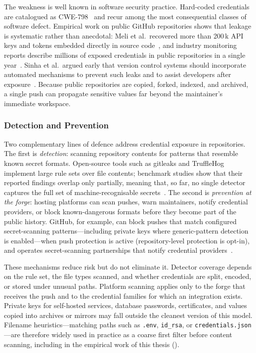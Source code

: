 The weakness is well known in software security practice.
Hard-coded credentials are catalogued as CWE-798~\cite{cwe798} and recur among the most consequential classes of software defect.
Empirical work on public GitHub repositories shows that leakage is systematic rather than anecdotal: Meli et al.\ recovered more than \num{200}\,k API keys and tokens embedded directly in source code~\cite{DBLP:conf/ndss/MeliMR19}, and industry monitoring reports describe millions of exposed credentials in public repositories in a single year~\cite{segura2022secrets}.
Sinha et al.\ argued early that version control systems should incorporate automated mechanisms to prevent such leaks and to assist developers after exposure~\cite{DBLP:conf/msr/SinhaSDPM15}.
Because public repositories are copied, forked, indexed, and archived, a single push can propagate sensitive values far beyond the maintainer's immediate workspace.

\subsubsection{Detection and Prevention}
\label{subsec:bg-secrets-detection}

Two complementary lines of defence address credential exposure in repositories.
The first is \emph{detection}: scanning repository contents for patterns that resemble known secret formats.
Open-source tools such as gitleaks and TruffleHog implement large rule sets over file contents; benchmark studies show that their reported findings overlap only partially, meaning that, so far, no single detector captures the full set of machine-recognisable secrets~\cite{DBLP:conf/msr/BasakNRW23,DBLP:conf/esem/BasakCRW23}.
The second is \emph{prevention at the forge}: hosting platforms can scan pushes, warn maintainers, notify credential providers, or block known-dangerous formats before they become part of the public history.
GitHub, for example, can block pushes that match configured secret-scanning patterns---including private keys where generic-pattern detection is enabled---when push protection is active (repository-level protection is opt-in), and operates secret-scanning partnerships that notify credential providers~\cite{github_push_protection,github_secret_scanning}.

These mechanisms reduce risk but do not eliminate it.
Detector coverage depends on the rule set, the file types scanned, and whether credentials are split, encoded, or stored under unusual paths.
Platform scanning applies only to the forge that receives the push and to the credential families for which an integration exists.
Private keys for self-hosted services, database passwords, certificates, and values copied into archives or mirrors may fall outside the cleanest version of this model.
Filename heuristics---matching paths such as \texttt{.env}, \texttt{id\_rsa}, or \texttt{credentials.json}---are therefore widely used in practice as a coarse first filter before content scanning, including in the empirical work of this thesis ().

